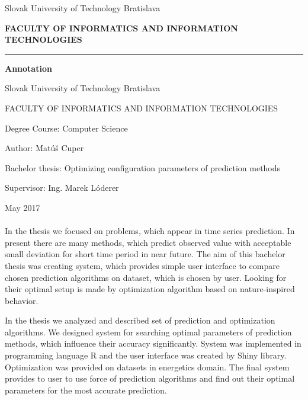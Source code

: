 \documentclass[a4paper,slovak,12pt,appendix]{article}
\begin{document}
\begin{titlepage}
\begin{center}
  {\small Slovak University of Technology Bratislava \par}
  {\small \textbf{FACULTY OF INFORMATICS AND INFORMATION TECHNOLOGIES}}
  \rule{\textwidth}{1pt}

  \vspace*{1.5cm}
  \begin{Large}
    \textbf{Annotation} \par
  \end{Large}
\end{center}
{Slovak University of Technology Bratislava \par}
{FACULTY OF INFORMATICS AND INFORMATION TECHNOLOGIES \par}
{Degree Course: Computer Science \par}
{Author: Matúš Cuper \par}
{Bachelor thesis: Optimizing configuration parameters of prediction methods \par}
{Supervisor: Ing. Marek Lóderer \par}
{May 2017 \\} \\
In the thesis we focused on problems, which appear in time series prediction.
In present there are many methods, which predict observed value with acceptable
small deviation for short time period in near future. The aim of this bachelor
thesis was creating system, which provides simple user interface to compare
chosen prediction algorithms on dataset, which is chosen by user. Looking for
their optimal setup is made by optimization algorithm based on nature-inspired
behavior.

In the thesis we analyzed and described set of prediction and optimization
algorithms. We designed system for searching optimal parameters of prediction
methods, which influence their accuracy significantly. System was implemented
in programming language R and the user interface was created by Shiny library.
Optimization was provided on datasets in energetics domain. The final
system provides to user to use force of prediction algorithms and find out
their optimal parameters for the most accurate prediction.
\end{titlepage}

\end{document}
